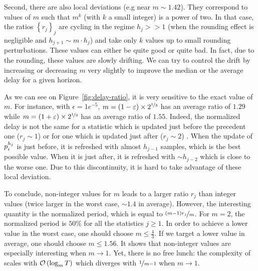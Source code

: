 Second, there are also local deviations (e.g near $m \sim 1.42$). They correspond to values of $m$ such that $m^{k}$ (with $k$ a small integer) is a power of two. In that case, the ratios $\left\{r_j\right\}_j$ are cycling in the regime $h_j >> 1$ (\ie when the rounding effect is negligible and $h_{j+1} \sim m\cdot h_j$)  and take only $k$ values up to small rounding perturbations. These values can either be quite good or quite bad. In fact, due to the rounding, these values are slowly drifting. We can try to control the drift by increasing or decreasing $m$ very slightly to improve the median or the average delay for a given horizon. 

As we can see on Figure~\ref{fig:delay-ratio}, it is very sensitive to the exact value of $m$. For instance, with $\epsilon = 1e^{-5}$,  $m = \left(1-\varepsilon\right) \times 2^{\nicefrac{1}{3}}$ has an average ratio of $1.29$ while $ m= \left(1+\varepsilon\right) \times 2^{\nicefrac{1}{3}}$ has an average ratio of $1.55$. Indeed, the normalized delay is not the same for a statistic which is updated just before the precedent one ($r_j \sim 1$) or for one which is updated just after ($r_j \sim 2$) . When the update of $p_i^{h_j}$ is just before, it is refreshed with almost $h_{j-1}$ samples, which is the best possible value. When it is just after, it is refreshed with $\sim h_{j-2}$ which is close to the worse one. Due to this discontinuity, it is hard to take advantage of these local deviation. %

To conclude, non-integer values for $m$ leads to a larger ratio $r_j$ than integer values (twice larger in the worst case, $\sim 1.4$ in average). However, the interesting quantity is the normalized period, which is equal to $\nicefrac{\left(m-1\right)r_j}{m}$. For $m=2$, the normalized period is $50\%$ for all the statistics $j\geq1$. In order to achieve a lower value in the worst case, one should choose $m\leq \frac{4}{3}$. If we target a lower value in average, one should choose $m\leq 1.56$. It shows that non-integer values are especially interesting when $m\rightarrow 1$. Yet, there is no free lunch: the complexity of \EFFU scales with $\mathcal{O}\left(\log_m T\right)$ which diverges with $\nicefrac{1}{m-1}$ when $m\rightarrow 1$.



